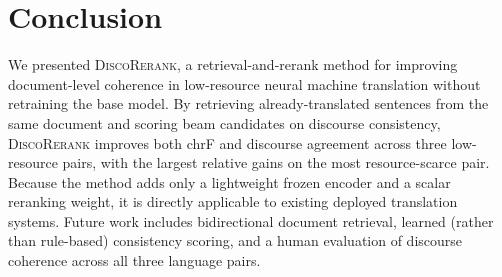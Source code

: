 \section{Conclusion}

We presented \textsc{DiscoRerank}, a retrieval-and-rerank method for
improving document-level coherence in low-resource neural machine
translation without retraining the base model. By retrieving
already-translated sentences from the same document and scoring beam
candidates on discourse consistency, \textsc{DiscoRerank} improves both
chrF and discourse agreement across three low-resource pairs, with the
largest relative gains on the most resource-scarce pair. Because the method
adds only a lightweight frozen encoder and a scalar reranking weight, it is
directly applicable to existing deployed translation systems. Future work
includes bidirectional document retrieval, learned (rather than rule-based)
consistency scoring, and a human evaluation of discourse coherence across
all three language pairs.
